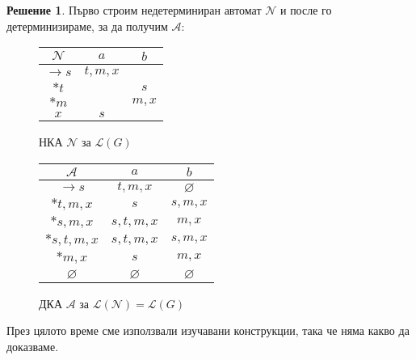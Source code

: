\documentclass{article}
\theoremstyle{definition}
\newtheorem*{solution}{Решение}
\begin{document}
\begin{solution}
    Първо строим недетерминиран автомат $\mathcal{N}$ и после го детерминизираме, за да получим $\mathcal{A}$:

    \begin{figure*}[h]
        \begin{subfigure}{0.5\linewidth}
            \centering
            \begin{tabular}{|c|c|c|}
                \hline
                $\mathcal{N}$   & $a$       & $b$    \\
                \hline
                $\rightarrow s$ & $t, m, x$ &        \\
                \hline
                $*t$            &           & $s$    \\
                \hline
                $*m$            &           & $m, x$ \\
                \hline
                $x$             & $s$       &        \\
                \hline
            \end{tabular}
            \caption*{НКА $\mathcal{N}$ за $\mathcal{L}(G)$}
        \end{subfigure}
        \begin{subfigure}{0.5\linewidth}
            \centering
            \begin{tabular}{|c|c|c|}
                \hline
                $\mathcal{A}$   & $a$           & $b$           \\
                \hline
                $\rightarrow s$ & $t, m, x$     & $\varnothing$ \\
                \hline
                $*t, m, x$      & $s$           & $s, m, x$     \\
                \hline
                $*s, m, x$      & $s, t, m, x$  & $m, x$        \\
                \hline
                $*s, t, m, x$   & $s, t, m, x$  & $s, m, x$     \\
                \hline
                $*m, x$         & $s$           & $m, x$        \\
                \hline
                $\varnothing$   & $\varnothing$ & $\varnothing$ \\
                \hline
            \end{tabular}
            \caption*{ДКА $\mathcal{A}$ за $\mathcal{L(N)} = \mathcal{L}(G)$}
        \end{subfigure}
    \end{figure*}

    През цялото време сме използвали изучавани конструкции, така че няма какво да доказваме.
\end{solution}
\end{document}
